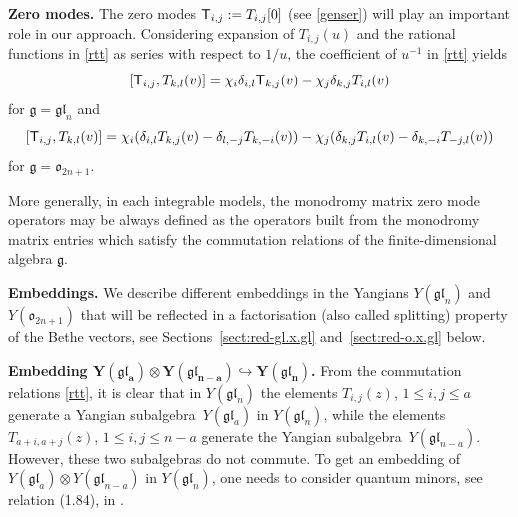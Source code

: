 \documentclass[10pt,a4paper]{amsart}
\theoremstyle{definition}
\def\r#1{\eqref{#1}}
\def\sT{{\sf T}}
\def\vk{\chi}
\begin{document}
{\bf Zero modes.}
The zero modes $\sT_{i,j} := T_{i,j}[0]$ (see \eqref{genser}) will play an important role in
our approach.
Considering expansion of $T_{i,j}(u)$ and the rational functions in \r{rtt} as series with respect to $1/u$, the coefficient of $u^{-1}$ in \r{rtt} yields
\begin{equation}
\label{Azm}
[\sT_{i,j},T_{k,l}(v)]=\vk_i \delta_{i,l} \sT_{k,j}(v)- \vk_j \delta_{k,j} T_{i,l}(v)
\end{equation}
for $\mathfrak{g}=\mathfrak{gl}_n$ and
\begin{equation}
\label{zm1}
[\sT_{i,j},T_{k,l}(v)]=\vk_i (\delta_{i,l} T_{k,j}(v)-\delta_{l,-j} T_{k,-i}(v))
-\vk_j (\delta_{k,j} T_{i,l}(v)-\delta_{k,-i} T_{-j,l}(v))
\end{equation}
for $\mathfrak{g}=\mathfrak{o}_{2n+1}$.

More generally,
in each integrable models,
 the monodromy matrix zero mode operators may be always defined as the
 operators built from the monodromy matrix entries
 which
satisfy the commutation relations of the finite-dimensional algebra $\mathfrak{g}$.



{\bf Embeddings.}
We describe different embeddings in the Yangians $Y(\mathfrak{gl}_{n})$ and $Y(\mathfrak{o}_{2n+1})$ that will be reflected in a factorisation (also called splitting) property of the Bethe vectors, see Sections~\ref{sect:red-gl.x.gl} and~\ref{sect:red-o.x.gl} below.


{\bf Embedding $\boldsymbol{Y(\mathfrak{gl}_a)\otimes Y(\mathfrak{gl}_{n-a})
\hookrightarrow Y(\mathfrak{gl}_{n})}$.}
From the commutation relations \eqref{rtt}, it is clear that in $Y(\mathfrak{gl}_{n})$ the elements
$T_{i,j}(z)$, $1\leq i,j\leq a$ generate a Yangian subalgebra~$Y(\mathfrak{gl}_{a})$ in $Y(\mathfrak{gl}_{n})$, while the elements $T_{a+i,a+j}(z)$, $1\leq i,j\leq n-a$ generate the Yangian subalgebra~$Y(\mathfrak{gl}_{n-a})$. However, these two subalgebras do not commute. To get an embedding of~${Y(\mathfrak{gl}_a)\otimes Y(\mathfrak{gl}_{n-a})}$ in $Y(\mathfrak{gl}_{n})$, one needs to consider quantum minors,
see relation (1.84), in \cite[Corollaries 1.7.2 and 1.11.4]{Molev}.
\end{document}
